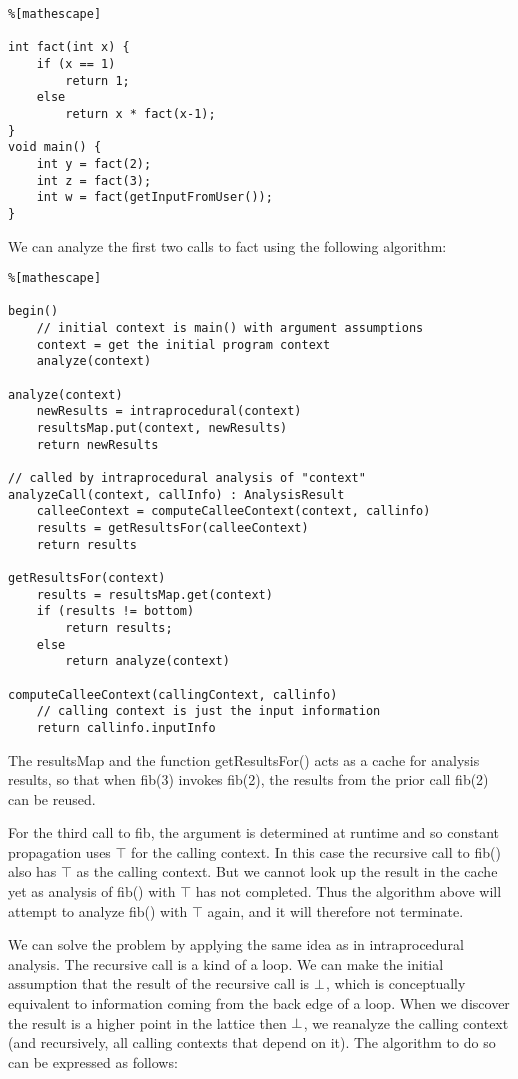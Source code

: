 \documentclass[11pt]{article}
\begin{document}
\begin{lstlisting}%[mathescape]

int fact(int x) {
    if (x == 1)
        return 1;
    else
        return x * fact(x-1);
}
void main() {
    int y = fact(2);
    int z = fact(3);
    int w = fact(getInputFromUser());
}
\end{lstlisting}

We can analyze the first two calls to fact using the following algorithm:

\begin{lstlisting}%[mathescape]

begin()
    // initial context is main() with argument assumptions
    context = get the initial program context
    analyze(context)

analyze(context)
    newResults = intraprocedural(context)
    resultsMap.put(context, newResults)
    return newResults

// called by intraprocedural analysis of "context"	
analyzeCall(context, callInfo) : AnalysisResult
    calleeContext = computeCalleeContext(context, callinfo)
    results = getResultsFor(calleeContext)
    return results

getResultsFor(context)
    results = resultsMap.get(context)
    if (results != bottom)
        return results;
    else
        return analyze(context)
		
computeCalleeContext(callingContext, callinfo)
    // calling context is just the input information
    return callinfo.inputInfo

\end{lstlisting}

The resultsMap and the function getResultsFor() acts as a cache for analysis results, so that when fib(3) invokes fib(2), the results from the prior call fib(2) can be reused.

For the third call to fib, the argument is determined at runtime and so constant propagation uses $\top$ for the calling context.  In this case the recursive call to fib() also has $\top$ as the calling context.  But we cannot look up the result in the cache yet as analysis of fib() with $\top$ has not completed.  Thus the algorithm above will attempt to analyze fib() with $\top$ again, and it will therefore not terminate.

We can solve the problem by applying the same idea as in intraprocedural analysis.  The recursive call is a kind of a loop.  We can make the initial assumption that the result of the recursive call is $\bot$, which is conceptually equivalent to information coming from the back edge of a loop.  When we discover the result is a higher point in the lattice then $\bot$, we reanalyze the calling context (and recursively, all calling contexts that depend on it).  The algorithm to do so can be expressed as follows:
\end{document}
